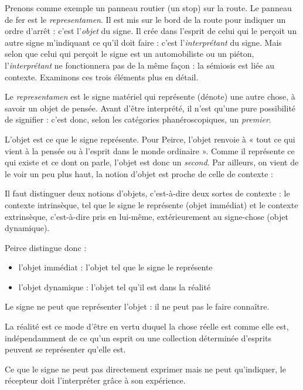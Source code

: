 Prenons comme exemple un panneau routier (un stop) sur la route. Le panneau de fer est le \textit{representamen}. Il est mis sur le bord de la route pour indiquer un ordre d’arrêt : c’est l’\textit{objet} du signe. Il crée dans l’esprit de celui qui le perçoit un autre signe m’indiquant ce qu’il doit faire : c’est l’\textit{interprétant} du signe. Mais selon que celui qui perçoit le signe est un automobiliste ou un piéton, l’\textit{interprétant} ne fonctionnera pas de la même façon : la sémiosis est liée au contexte. Examinons ces trois éléments plus en détail.

Le \textit{representamen} est le signe matériel qui représente (dénote) une autre chose, à savoir un objet de pensée. Avant d’être interprété, il n’est qu’une pure possibilité de signifier : c’est donc, selon les catégories phanéroscopiques, un \textit{premier}.

L’objet est ce que le signe représente. Pour Peirce, l’objet renvoie à « tout ce qui vient à la pensée ou à l’esprit dans le monde ordinaire ». Comme il représente ce qui existe et ce dont on parle, l’objet est donc un \textit{second}. Par ailleurs, on vient de le voir un peu plus haut, la notion d’objet est proche de celle de contexte :
\begin{lecture}{}
Il faut distinguer deux notions d’objets, c’est-à-dire deux sortes de contexte : le contexte intrinsèque, tel que le signe le représente (objet immédiat) et le contexte extrinsèque, c’est-à-dire pris en lui-même, extérieurement au signe-chose (objet dynamique).
\end{lecture}
Peirce distingue donc :
\begin{itemize}
\item l’objet immédiat : l’objet tel que le signe le représente
\item l’objet dynamique : l’objet tel qu’il est dans la réalité
\end{itemize}
Le signe ne peut que représenter l’objet : il ne peut pas le faire connaître.
\begin{lecture}{}
La réalité est ce mode d’être en vertu duquel la chose réelle est comme elle est, indépendamment de ce qu’un esprit ou une collection déterminée d’esprits peuvent se représenter qu’elle est.
\end{lecture}
Ce que le signe ne peut pas directement exprimer mais ne peut qu’indiquer, le récepteur doit l’interpréter grâce à son expérience.

